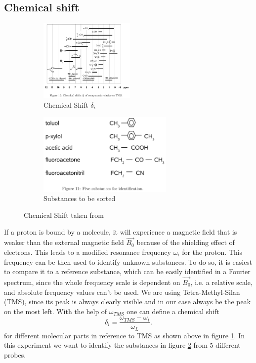 \subsection{Chemical shift}\label{chemShift}
\begin{figure}[h]
	\begin{subfigure}{0.5\textwidth}
	\centering
	\includegraphics[width=0.7\linewidth ,height=4cm]{images/ChemShift.png}
	\caption{Chemical Shift $\delta_i$}
	\label{shi1}
	\end{subfigure}
	\begin{subfigure}{0.5\textwidth}
	\includegraphics[width=0.7\linewidth ,height=4cm]{images/substances.png}
	\caption{Substances to be sorted}
	\label{shi2}
	\end{subfigure}
	\caption{Chemical Shift taken from \cite{manual}}
	\label{shi3}
\end{figure}
If a proton is bound by a molecule, it will experience a magnetic field that is weaker than the external magnetic field $\vec{B_0}$ because of the shielding effect of electrons. This leads to a modified resonance frequency $\omega_i$ for the proton. This frequency can be then used to identify unknown substances. To do so, it is easiest to compare it to a reference substance, which can be easily identified in a Fourier spectrum, since the whole frequency scale is dependent on $\vec{B_0}$, i.e. a relative scale, and absolute frequency values can't be used. We are using Tetra-Methyl-Silan (TMS), since its peak is always clearly visible and in our case always be the peak on the most left. With the help of $\omega_{TMS}$ one can define a chemical shift
\begin{equation}\label{deltashift}
	\delta_i = \frac{\omega_{TMS}-\omega_{i}}{\omega_{L}}.
\end{equation} 
for different molecular parts in reference to TMS as shown above in figure \ref{shi1}. In this experiment we want to identify the substances in figure \ref{shi2} from 5 different probes. \\

